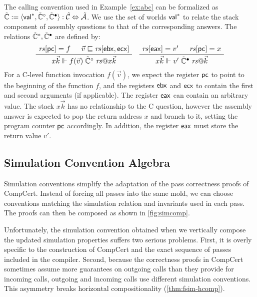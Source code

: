 \begin{example} %
The calling convention used in Example~\ref{ex:abc}
can be formalized as %
$\tilde{\mathbb{C}} :=
  \langle  \mathsf{val} ^*, \tilde{\mathbb{C}}^\circ, \tilde{\mathbb{C}}^\bullet \rangle :
    \tilde{\mathcal{C}} \Leftrightarrow \tilde{\mathcal{A}}$.
We use the set of worlds $ \mathsf{val} ^*$
to relate the stack component of
assembly questions to that of the corresponding answers.
The relations $\tilde{\mathbb{C}}^\circ, \tilde{\mathbb{C}}^\bullet$
are defined by:
\[
  \figsize
  \AxiomC{$\mathit{rs}[\kw{pc}] = f$}
  \AxiomC{\hspace{-1em} $\vec{v} \sqsubseteq \mathit{rs}[\kw{ebx}, \kw{ecx}]$}
  \BinaryInfC{$
    x \vec{k} \Vdash
    f(\vec{v}) \mathrel{\tilde{\mathbb{C}}^\que} \mathit{rs}@ x \vec{k}
  $}
  \DisplayProof
  \quad
  \AxiomC{$\mathit{rs}[\kw{eax}] = v'$}
  \AxiomC{\hspace{-1em} $\mathit{rs}[\kw{pc}] = x$}
  \BinaryInfC{$
    x \vec{k} \Vdash
    v' \mathrel{\tilde{\mathbb{C}}^\ans} \mathit{rs}@\vec{k}
  $}
  \DisplayProof
\]
For a C-level function invocation $f(\vec{v})$,
we expect the register $ \mathsf{pc} $ to point to
the beginning of the function $f$,
and the registers $ \mathsf{ebx} $ and $ \mathsf{ecx} $
to contain the first and second arguments (if applicable).
The register $ \mathsf{eax} $ can contain an arbitrary value.
The stack $x \vec{k}$ has no relationship to the C question,
however the assembly answer is expected to pop the return address $x$
and branch to it, setting the program counter $ \mathsf{pc} $ accordingly.
In addition,
the register $ \mathsf{eax} $
must store
the return value $v'$.
\end{example}


\subsection{Simulation Convention Algebra} \label{sec:mainideas:simalg} %

Simulation conventions
simplify the adaptation of the pass correctness proofs of CompCert.
Instead of forcing all passes into the same mold,
we can choose conventions matching
the simulation relation and invariants
used in each pass.
The proofs can then be composed
as shown in \ref{fig:simcomp}.

Unfortunately,
the simulation convention obtained
when we vertically compose the updated simulation properties
suffers two serious problems.
First,
it is overly specific to the construction of CompCert
and the exact sequence of passes included in the compiler.
Second,
because the correctness proofs in CompCert
sometimes assume more guarantees on outgoing calls
than they provide for incoming calls,
outgoing and incoming calls use different simulation conventions.
This asymmetry breaks %
horizontal compositionality (\ref{thm:fsim-hcomp}).

